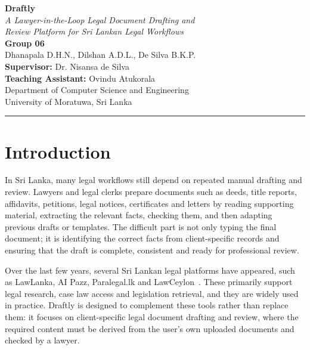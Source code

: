 \documentclass[11pt,a4paper]{article}
\begin{document}
\begin{center}

{\color{accent}\fontsize{36}{40}\selectfont\textbf{Draftly}}\\[0.55em]

{\color{accent}\large\itshape
A Lawyer-in-the-Loop Legal Document Drafting and \\[0.15em]
Review Platform for Sri Lankan Legal Workflows
}\\[1.0em]

{\normalsize
\textbf{Group 06}\\[0.3em]
Dhanapala D.H.N., Dilshan A.D.L., De Silva B.K.P.
}\\[0.1em]

{\normalsize
\textbf{Supervisor:} Dr. Nisansa de Silva\\
\textbf{Teaching Assistant:} Ovindu Atukorala\\[1em]
Department of Computer Science and Engineering\\
University of Moratuwa, Sri Lanka
}\\[0.8em]

\end{center}

\vspace{0.7em}
{\color{accent}\rule{\linewidth}{1pt}}

\section{Introduction}

In Sri Lanka, many legal workflows still depend on repeated manual drafting and review.
Lawyers and legal clerks prepare documents such as deeds, title reports, affidavits,
petitions, legal notices, certificates and letters by reading supporting material,
extracting the relevant facts, checking them, and then adapting previous drafts or
templates. The difficult part is not only typing the final document; it is identifying
the correct facts from client-specific records and ensuring that the draft is complete,
consistent and ready for professional review.

Over the last few years, several Sri Lankan legal platforms have appeared, such as
LawLanka, AI Pazz, Paralegal.lk and
LawCeylon~\cite{lawlanka,aipazz,paralegal,lawceylon}.
These primarily support legal research,
case law access and legislation retrieval, and they are widely used in practice.
Draftly is designed to complement these tools rather than replace them: it focuses on
client-specific legal document drafting and review, where the required content must be
derived from the user's own uploaded documents and checked by a lawyer.
\end{document}
